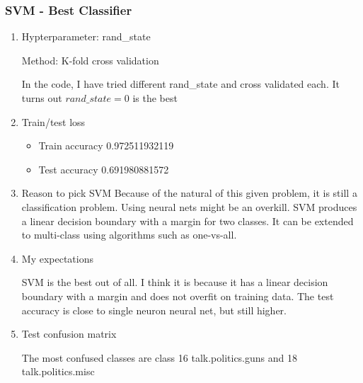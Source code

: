 \documentclass[letterpaper, 12pt]{article}
\begin{document}
\subsubsection{SVM - Best Classifier}
\begin{enumerate}

    \item Hypterparameter: rand\_state
    
	Method: K-fold cross validation

	In the code, I have tried different rand\_state and cross validated each. It turns out $rand\_state = 0$ is the best
	
	\item Train/test loss
	\begin{itemize}
     \item  Train accuracy  0.972511932119
     \item Test accuracy 0.691980881572
        \end{itemize}
        
 	\item Reason to pick SVM
	Because of the natural of this given problem, it is still a classification problem. Using neural nets might be an overkill. SVM produces a linear decision boundary with a margin for two classes. It can be extended to multi-class using algorithms such as one-vs-all.
        
          \item My expectations
     
      SVM is the best out of all. I think it is because it has a linear decision boundary with a margin and does not overfit on training data. The test accuracy is close to single neuron neural net, but still higher.
  

        
        \item Test confusion matrix
        
        The most confused classes are class 16 talk.politics.guns and 18 talk.politics.misc


\end{enumerate}
\end{document}
